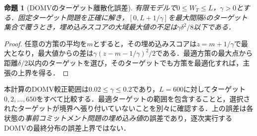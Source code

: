 \documentclass[11pt,a4paper]{article}
\numberwithin{equation}{section}
\numberwithin{table}{section}
\numberwithin{figure}{section}
\theoremstyle{plain}
\newtheorem{proposition}{命題}
\theoremstyle{definition}
\begin{document}
\begin{proposition}[DOMVのターゲット離散化誤差]
有限モデルで$0\leq W_T\leq L$，$\gamma>0$とする．固定ターゲット問題を正確に解き，$[0,L+1/\gamma]$を最大間隔$\delta$のターゲット集合で覆うとき，埋め込みスコアの大域最大値の不足は$\gamma\delta^2/8$以下である．
\end{proposition}
\begin{proof}
任意の方策の平均を$m$とすると，その埋め込みスコアは$z=m+1/\gamma$で最大となり，最大値からの差は$\gamma(z-m-1/\gamma)^2/2$である．最適方策の最大点から距離$\delta/2$以内のターゲットを選び，そのターゲットでも方策を最適化すれば，主張の上界を得る．
\end{proof}
本計算のDOMV較正範囲は$0.02\leq\gamma\leq0.2$であり，$L=600$に対してターゲット$0,2,\ldots,650$をすべて比較する．最適ターゲットの範囲を包含することと，選択されたターゲットが境界へ張り付いていないことを別々に確認する．上の誤差は各状態の\emph{事前コミットメント問題の埋め込み値}の誤差であり，逐次実行するDOMVの最終分布の誤差上界ではない．
\end{document}

